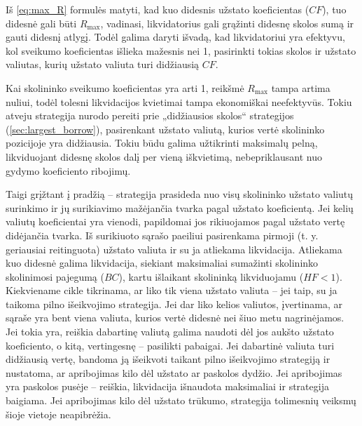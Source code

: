\documentclass[]{VUMIFTemplateClass}
\begin{document}
Iš \ref{eq:max_R} formulės matyti, kad kuo didesnis užstato koeficientas ($CF$), tuo didesnė gali būti $R_{\text{max}}$, vadinasi, likvidatorius gali grąžinti didesnę skolos sumą ir gauti didesnį atlygį. Todėl galima daryti išvadą, kad likvidatoriui yra efektyvu, kol sveikumo koeficientas išlieka mažesnis nei 1, pasirinkti tokias skolos ir užstato valiutas, kurių užstato valiuta turi didžiausią $CF$.

Kai skolininko sveikumo koeficientas yra arti 1, reikšmė $R_{\text{max}}$ tampa artima nuliui, todėl tolesni likvidacijos kvietimai tampa ekonomiškai neefektyvūs. Tokiu atveju strategija nurodo pereiti prie „didžiausios skolos“ strategijos (\ref{sec:largest_borrow}), pasirenkant užstato valiutą, kurios vertė skolininko pozicijoje yra didžiausia. Tokiu būdu galima užtikrinti maksimalų pelną, likviduojant didesnę skolos dalį per vieną iškvietimą, nebepriklausant nuo gydymo koeficiento ribojimų.


Taigi grįžtant į pradžią – strategija prasideda nuo visų skolininko užstato valiutų surinkimo ir jų surikiavimo mažėjančia tvarka pagal užstato koeficientą. Jei kelių valiutų koeficientai yra vienodi, papildomai jos rikiuojamos pagal užstato vertę didėjančia tvarka. Iš surikiuoto sąrašo paeiliui pasirenkama pirmoji (t. y. geriausiai reitinguota) užstato valiuta ir su ja atliekama likvidacija. Atliekama kuo didesnė galima likvidacija, siekiant maksimaliai sumažinti skolininko skolinimosi pajegumą ($BC$), kartu išlaikant skolininką likviduojamu ($HF < 1$). Kiekviename cikle tikrinama, ar liko tik viena užstato valiuta – jei taip, su ja taikoma pilno išeikvojimo strategija. Jei dar liko kelios valiutos, įvertinama, ar sąraše yra bent viena valiuta, kurios vertė didesnė nei šiuo metu nagrinėjamos. Jei tokia yra, reiškia dabartinę valiutą galima naudoti dėl jos aukšto užstato koeficiento, o kitą, vertingesnę – pasilikti pabaigai. Jei dabartinė valiuta turi didžiausią vertę, bandoma ją išeikvoti taikant pilno išeikvojimo strategiją ir nustatoma, ar apribojimas kilo dėl užstato ar paskolos dydžio. Jei apribojimas yra paskolos pusėje – reiškia, likvidacija išnaudota maksimaliai ir strategija baigiama. Jei apribojimas kilo dėl užstato trūkumo, strategija tolimesnių veiksmų šioje vietoje neapibrėžia.
\end{document}
